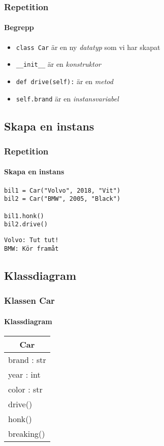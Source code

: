\documentclass[aspectratio=169]{beamer}
\begin{document}
\begin{frame}
	\frametitle{Repetition}
	\framesubtitle{Begrepp}
	
	\begin{itemize}
		\item \texttt{class Car} är en ny \textit{datatyp} som vi har skapat
		\item \texttt{\_\_init\_\_} är en \textit{konstruktor}
		\item \texttt{def drive(self):} är en \textit{metod}
		\item \texttt{self.brand} är en \textit{instansvariabel}
	\end{itemize}
\end{frame}

\subsection{Skapa en instans}

\begin{frame}[fragile]
	\frametitle{Repetition}
	\framesubtitle{Skapa en instans}
	
	\begin{lstlisting}
bil1 = Car("Volvo", 2018, "Vit")
bil2 = Car("BMW", 2005, "Black")

bil1.honk()
bil2.drive()
	\end{lstlisting}
	
	\begin{verbatim}
Volvo: Tut tut!
BMW: Kör framåt
	\end{verbatim}

\end{frame}

\subsection{Klassdiagram}

\begin{frame}
	\frametitle{Klassen Car}
	\framesubtitle{Klassdiagram}
	
	\centering
	\begin{tabular}{|l|}
		\hline
		\multicolumn{1}{|c|}{\textbf{Car}} \\
		\hline
		brand : str\\
		year : int\\
		color : str\\ \hline
		drive() \\
		honk() \\
		breaking() \\ \hline
	\end{tabular}

\end{frame}
\end{document}
